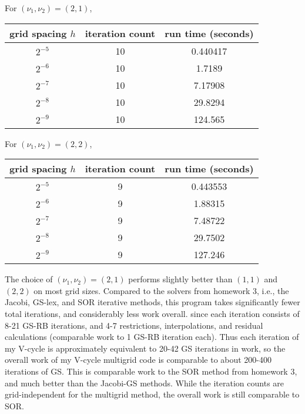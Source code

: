 \documentclass[12pt]{article}
\begin{document}
\noindent For $(\nu_1, \nu_2) = (2,1)$,  \\
\begin{center}
\begin{tabular}{||c|c|c||}
\hline \hline
   grid spacing $h$ &   iteration count &   run time (seconds) \\
\hline \hline
       $2^{-5}$   &                10 &             0.440417 \\
       $2^{-6}$   &                10 &             1.7189   \\
       $2^{-7}$  &                10 &             7.17908  \\
       $2^{-8}$ &                10 &            29.8294   \\
       $2^{-9}$ & 10 & 124.565 \\
\hline \hline
\end{tabular}
\end{center}

\noindent For $(\nu_1, \nu_2) = (2,2)$,  \\
\begin{center}
\begin{tabular}{||c|c|c||}
\hline \hline
   grid spacing $h$ &   iteration count &   run time (seconds) \\
\hline \hline
       $2^{-5}$    &                 9 &             0.443553 \\
       $2^{-6}$   &                 9 &             1.88315  \\
       $2^{-7}$ &                 9 &             7.48722  \\
       $2^{-8}$ &                 9 &            29.7502   \\
       $2^{-9}$ & 9 & 127.246 \\
\hline \hline
\end{tabular}
\end{center}

The choice of $(\nu_1, \nu_2) = (2,1)$ performs slightly better than $(1,1)$ and $(2,2)$ on most grid sizes.  Compared to the solvers from homework 3, i.e., the Jacobi, GS-lex, and SOR iterative methods, this program takes significantly fewer total iterations, and considerably less work overall. since each iteration consists of 8-21 GS-RB iterations, and 4-7 restrictions, interpolations, and residual calculations (comparable work to 1 GS-RB iteration each). Thus each iteration of my V-cycle is approximately equivalent to 20-42 GS iterations in work, so the overall work of my V-cycle multigrid code is comparable to about 200-400 iterations of GS.  This is comparable work to the SOR method from homework 3, and much better than the Jacobi-GS methods.  While the iteration counts are grid-independent for the multigrid method, the overall work is still comparable to SOR.
\end{document}
